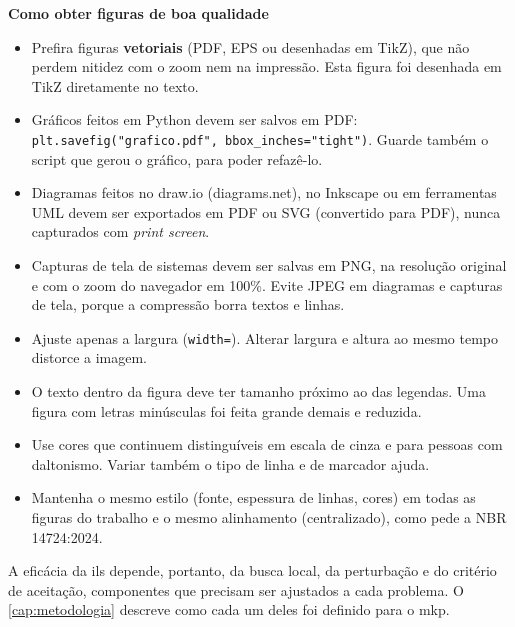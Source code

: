 \begin{instrucao}
\textbf{Como obter figuras de boa qualidade}
\begin{itemize}
  \item Prefira figuras \textbf{vetoriais} (PDF, EPS ou desenhadas em TikZ),
        que não perdem nitidez com o zoom nem na impressão. Esta figura foi
        desenhada em TikZ diretamente no texto.
  \item Gráficos feitos em Python devem ser salvos em PDF:
        \verb|plt.savefig("grafico.pdf", bbox_inches="tight")|. Guarde também o
        script que gerou o gráfico, para poder refazê-lo.
  \item Diagramas feitos no draw.io (diagrams.net), no Inkscape ou em
        ferramentas UML devem ser exportados em PDF ou SVG (convertido para
        PDF), nunca capturados com \emph{print screen}.
  \item Capturas de tela de sistemas devem ser salvas em PNG, na resolução
        original e com o zoom do navegador em 100\%. Evite JPEG em diagramas e
        capturas de tela, porque a compressão borra textos e linhas.
  \item Ajuste apenas a largura (\verb|width=|). Alterar largura e altura ao
        mesmo tempo distorce a imagem.
  \item O texto dentro da figura deve ter tamanho próximo ao das legendas.
        Uma figura com letras minúsculas foi feita grande demais e reduzida.
  \item Use cores que continuem distinguíveis em escala de cinza e para
        pessoas com daltonismo. Variar também o tipo de linha e de marcador
        ajuda.
  \item Mantenha o mesmo estilo (fonte, espessura de linhas, cores) em todas
        as figuras do trabalho e o mesmo alinhamento (centralizado), como pede
        a NBR 14724:2024.
\end{itemize}
\end{instrucao}

A eficácia da \acs{ils} depende, portanto, da busca local, da perturbação e
do critério de aceitação, componentes que precisam ser ajustados a cada
problema. O \cref{cap:metodologia} descreve como cada um deles foi definido
para o \acs{mkp}.
